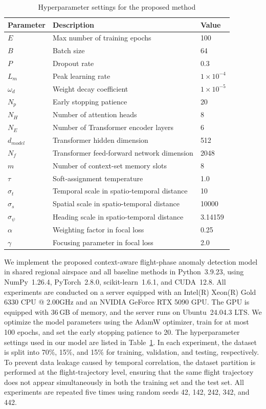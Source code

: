 \documentclass[iicol,pdflatex,sn-basic,Numbered]{sn-jnl}%
\theoremstyle{thmstyleone}%
\theoremstyle{thmstyletwo}%
\theoremstyle{thmstylethree}%
\begin{document}
\begin{table}[t]
  \centering
  \setlength{\tabcolsep}{2pt}
  \renewcommand{\arraystretch}{1.05}
  \caption{Hyperparameter settings for the proposed method}
  \label{tab:hyperparameters}
  \tablebodyfont
  \begin{tabularx}{\columnwidth}{@{}l>{\raggedright\arraybackslash}Xl@{}}
    \toprule
    Parameter & Description & Value \\
    \midrule
    $E$ & Max number of training epochs & 100 \\
    $B$ & Batch size & 64 \\
    $P$ & Dropout rate & 0.3 \\
    $L_m$ & Peak learning rate & $1 \times 10^{-4}$ \\
    $\omega_d$ & Weight decay coefficient & $1 \times 10^{-5}$ \\
    $N_p$ & Early stopping patience & 20 \\
    $N_H$ & Number of attention heads & 8 \\
    $N_E$ & Number of Transformer encoder layers & 6 \\
    $d_{model}$ & Transformer hidden dimension & 512 \\
    $N_f$ & Transformer feed-forward network dimension & 2048 \\
    $m$ & Number of context-set memory slots & 8 \\
    $\tau$ & Soft-assignment temperature & 1.0 \\
    $\sigma_t$ & Temporal scale in spatio-temporal distance & 10 \\
    $\sigma_s$ & Spatial scale in spatio-temporal distance & 10000 \\
    $\sigma_{\psi}$ & Heading scale in spatio-temporal distance & 3.14159 \\
    $\alpha$ & Weighting factor in focal loss & 0.25 \\
    $\gamma$ & Focusing parameter in focal loss & 2.0 \\
    \bottomrule
  \end{tabularx}
\end{table}
We implement the proposed context-aware flight-phase anomaly detection model in shared regional airspace and all baseline methods in Python~3.9.23, using NumPy~1.26.4, PyTorch~2.8.0, scikit-learn~1.6.1, and CUDA~12.8.
All experiments are conducted on a server equipped with an Intel(R) Xeon(R) Gold 6330 CPU @ 2.00GHz and an NVIDIA GeForce RTX 5090 GPU.
The GPU is equipped with 36\,GB of memory, and the server runs on Ubuntu~24.04.3 LTS.
We optimize the model parameters using the AdamW optimizer, train for at most 100 epochs, and set the early stopping patience to 20.
The hyperparameter settings used in our model are listed in Table~\ref{tab:hyperparameters}.
In each experiment, the dataset is split into 70\%, 15\%, and 15\% for training, validation, and testing, respectively.
To prevent data leakage caused by temporal correlation, the dataset partition is performed at the flight-trajectory level, ensuring that the same flight trajectory does not appear simultaneously in both the training set and the test set.
All experiments are repeated five times using random seeds 42, 142, 242, 342, and 442.
\end{document}
